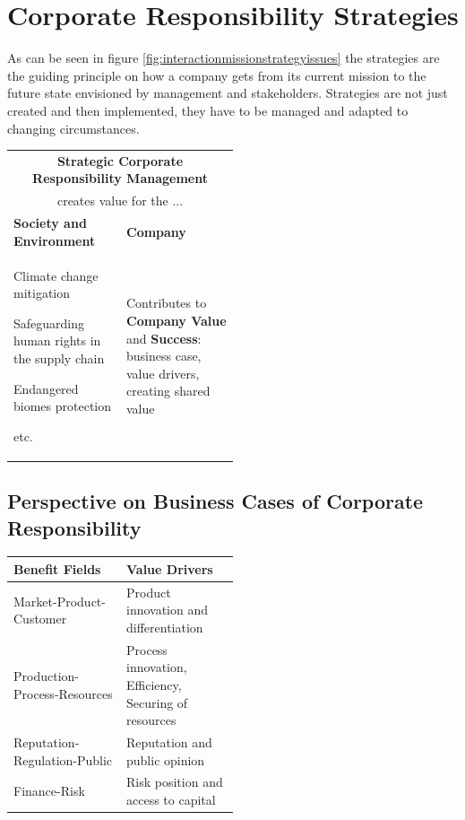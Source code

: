 \documentclass[11pt]{article}
\theoremstyle{definition}
\begin{document}
\section{Corporate Responsibility Strategies}
As can be seen in figure \ref{fig:interactionmissionstrategyissues} the strategies are the guiding principle on how a company gets from its current mission to the future state envisioned by management and stakeholders. Strategies are not just created and then implemented, they have to be managed and adapted to changing circumstances.

\begin{tabularx}{\linewidth}{p{0.5\linewidth} X}
	\multicolumn{2}{c}{\textbf{Strategic Corporate Responsibility Management}}\\
	\multicolumn{2}{c}{creates value for the ...}\\[0.5em]
	\textbf{Society and Environment} & \textbf{Company}\\[0.5em]
	\begin{itemize}
		[
		left=0pt,
		nosep,
		before={\begin{minipage}[t]{\hsize}},
			after={\end{minipage}}
		]
		\item Climate change mitigation
		\item Safeguarding human rights in the supply chain
		\item Endangered biomes protection
		\item etc.
	\end{itemize} & Contributes to \textbf{Company Value} and \textbf{Success}: business case, value drivers, creating shared value
\end{tabularx}

\subsection{Perspective on Business Cases of Corporate Responsibility}
\begin{tabularx}{\linewidth}{p{0.5\linewidth} X}
	\textbf{Benefit Fields} & \textbf{Value Drivers}\\
	\hline
	Market-Product-Customer & Product innovation and differentiation\\
	Production-Process-Resources & Process innovation, Efficiency, Securing of resources\\
	Reputation-Regulation-Public & Reputation and public opinion\\
	Finance-Risk & Risk position and access to capital
\end{tabularx}
\end{document}
